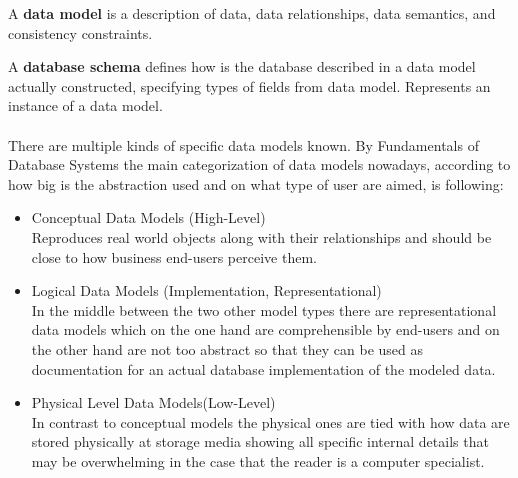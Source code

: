 \par
A \textbf{data model} is a description of data, data relationships, data semantics, and consistency constraints. \label{DataModel} \\
\par 
A \textbf{database schema} defines how is the database described in a data model actually constructed, specifying types of fields from data model. Represents an instance of a data model. \\
\\
There are multiple kinds of specific data models known.
By Fundamentals of Database Systems \cite{SilberschatzKorthSudarshan10} the main categorization of data models nowadays, according to how big is the abstraction used and on what type of user are aimed, is following: \label{DataModelsByAbstraction}
\begin{itemize}
	\item Conceptual Data Models (High-Level) \\
		Reproduces real world objects along with their relationships and should be close to how business end-users perceive them.
	
	\item Logical Data Models (Implementation, Representational) \\
		In the middle between the two other model types there are representational data models which on the one hand are comprehensible by end-users and on the other hand are not too abstract so that they can be used as documentation for an actual database implementation of the modeled data.
	
	\item Physical Level Data Models(Low-Level) \\
		 In contrast to conceptual models the physical ones are tied with how data are stored physically at storage media showing all specific internal details that may be overwhelming in the case that the reader is a computer specialist.
\end{itemize}

